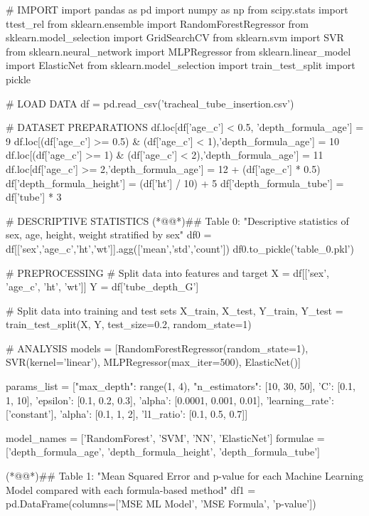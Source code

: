 \documentclass[11pt]{article}
\begin{document}
\begin{python}


# IMPORT
import pandas as pd
import numpy as np
from scipy.stats import ttest_rel
from sklearn.ensemble import RandomForestRegressor
from sklearn.model_selection import GridSearchCV
from sklearn.svm import SVR
from sklearn.neural_network import MLPRegressor
from sklearn.linear_model import ElasticNet
from sklearn.model_selection import train_test_split
import pickle

# LOAD DATA
df = pd.read_csv('tracheal_tube_insertion.csv')

# DATASET PREPARATIONS
df.loc[df['age_c'] < 0.5, 'depth_formula_age'] = 9
df.loc[(df['age_c'] >= 0.5) & (df['age_c'] < 1),'depth_formula_age'] = 10
df.loc[(df['age_c'] >= 1) & (df['age_c'] < 2),'depth_formula_age'] = 11 
df.loc[df['age_c'] >= 2,'depth_formula_age'] = 12 + (df['age_c'] * 0.5)
df['depth_formula_height'] = (df['ht'] / 10) + 5
df['depth_formula_tube'] = df['tube'] * 3

# DESCRIPTIVE STATISTICS
(*@@*)## Table 0: "Descriptive statistics of sex, age, height, weight stratified by sex"
df0 = df[['sex','age_c','ht','wt']].agg(['mean','std','count'])
df0.to_pickle('table_0.pkl')

# PREPROCESSING
# Split data into features and target
X = df[['sex', 'age_c', 'ht', 'wt']]
Y = df['tube_depth_G']

# Split data into training and test sets
X_train, X_test, Y_train, Y_test = train_test_split(X, Y, test_size=0.2, random_state=1)

# ANALYSIS
models = [RandomForestRegressor(random_state=1),
          SVR(kernel='linear'), 
          MLPRegressor(max_iter=500),
          ElasticNet()]

params_list = [{"max_depth": range(1, 4), "n_estimators": [10, 30, 50]},
                {'C': [0.1, 1, 10], 'epsilon': [0.1, 0.2, 0.3]},
                {'alpha': [0.0001, 0.001, 0.01], 'learning_rate': ['constant']},
                {'alpha': [0.1, 1, 2], 'l1_ratio': [0.1, 0.5, 0.7]}]

model_names = ['RandomForest', 'SVM', 'NN', 'ElasticNet']
formulae = ['depth_formula_age', 'depth_formula_height', 'depth_formula_tube']

(*@@*)## Table 1: "Mean Squared Error and p-value for each Machine Learning Model compared with each formula-based method"
df1 = pd.DataFrame(columns=['MSE ML Model', 'MSE Formula', 'p-value'])


\end{python}
\end{document}
